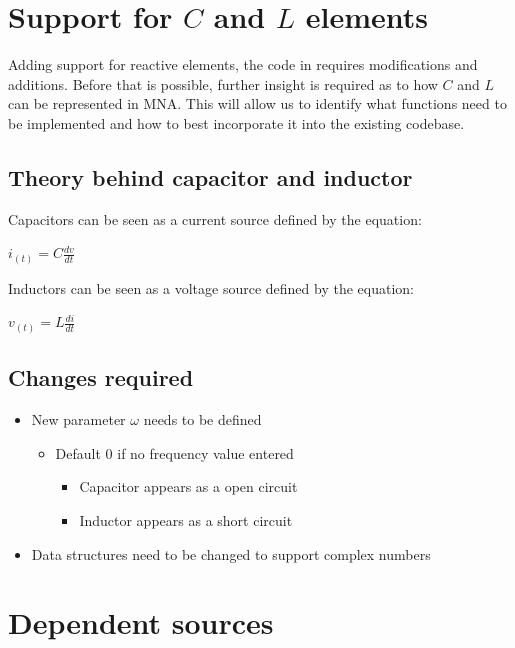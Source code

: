\documentclass[a4paper, titlepage]{article}
\begin{document}
    \section{Support for $C$ and $L$ elements}
    Adding support for reactive elements, the code in requires modifications and additions. Before that is possible, 
    further insight is required as to how $C$ and $L$ can be represented in MNA. This will allow us to identify what functions 
    need to be implemented and how to best incorporate it into the existing codebase.\par
    \subsection{Theory behind capacitor and inductor}
    Capacitors can be seen as a current source defined by the equation:
    \begin{center}
        $i_{(t)} = C\frac{dv}{dt}$ \par
    \end{center}
    Inductors can be seen as a voltage source defined by the equation:
    \begin{center}
        $v_{(t)} = L\frac{di}{dt}$ \par
    \end{center}
    \subsection{Changes required}
    \begin{itemize}
        \item New parameter $\omega$ needs to be defined
        \begin{itemize}
            \item Default 0 if no frequency value entered
            \begin{itemize}
                \item Capacitor appears as a open circuit
                \item Inductor appears as a short circuit
            \end{itemize}
        \end{itemize}
        \item Data structures need to be changed to support complex numbers
    \end{itemize}


   
    \pagebreak

    \section{Dependent sources}
    \pagebreak
\end{document}
